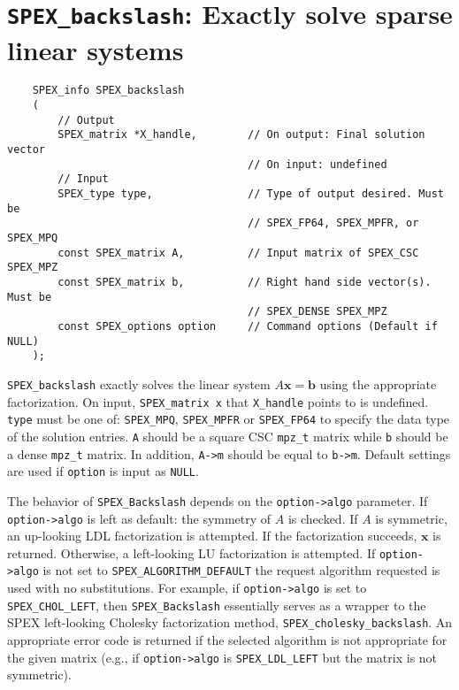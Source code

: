\documentclass[12pt,oneside]{book}
\theoremstyle{definition}
\newcommand{\x}{\mathbf{x}}
\begin{document}
\section{\texttt{SPEX\_backslash}: Exactly solve sparse linear systems}
\begin{mdframed}[userdefinedwidth=\textwidth]
{\footnotesize
\begin{verbatim}
    SPEX_info SPEX_backslash
    (
        // Output
        SPEX_matrix *X_handle,        // On output: Final solution vector
                                      // On input: undefined
        // Input
        SPEX_type type,               // Type of output desired. Must be
                                      // SPEX_FP64, SPEX_MPFR, or SPEX_MPQ
        const SPEX_matrix A,          // Input matrix of SPEX_CSC SPEX_MPZ
        const SPEX_matrix b,          // Right hand side vector(s). Must be
                                      // SPEX_DENSE SPEX_MPZ 
        const SPEX_options option     // Command options (Default if NULL)
    );
\end{verbatim}
} \end{mdframed}

\verb|SPEX_backslash| exactly solves the linear system $A \mathbf{x} = \mathbf{b}$ using the appropriate factorization. On input, \verb|SPEX_matrix x| that \verb|X_handle| points to is undefined. \verb|type| must be one of:
\verb|SPEX_MPQ|, \verb|SPEX_MPFR| or \verb|SPEX_FP64| to specify the data type
of the solution entries. \verb|A| should be a square CSC \verb|mpz_t| matrix
while \verb|b| should be a dense \verb|mpz_t| matrix. In addition, \verb|A->m|
should be equal to \verb|b->m|.  Default settings are used if
\verb|option| is input as \verb|NULL|.

The behavior of \verb|SPEX_Backslash| depends on the \verb|option->algo| parameter.
If \verb|option->algo| is left as default: the symmetry of $A$ is checked. If $A$ is symmetric,
an up-looking LDL factorization is attempted. If the factorization succeeds, $\x$ is returned. 
Otherwise, a left-looking LU factorization is attempted.
If \verb|option->algo| is not set to \verb'SPEX_ALGORITHM_DEFAULT' the request algorithm requested is used with no substitutions.
For example, if \verb|option->algo| is set to 
\verb|SPEX_CHOL_LEFT|, then \verb|SPEX_Backslash| essentially
serves as a wrapper to the SPEX left-looking Cholesky factorization method,
\verb|SPEX_cholesky_backslash|.
An appropriate error code is returned if the selected algorithm is not appropriate for the given matrix (e.g., if \verb|option->algo| is \verb|SPEX_LDL_LEFT| but the matrix is not symmetric).
\end{document}
